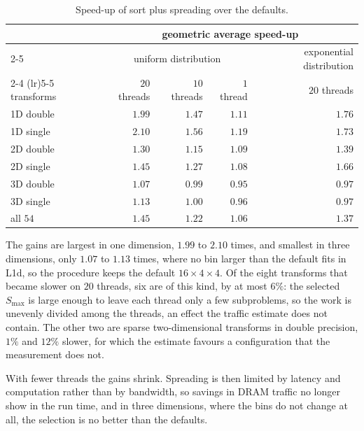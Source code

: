 \begin{table}[ht]
    \centering
    \small
    \begin{tabular}{lrrrr}
        \toprule
        & \multicolumn{4}{c}{geometric average speed-up} \\
        \cmidrule(lr){2-5}
        & \multicolumn{3}{c}{uniform distribution} & exponential distribution \\
        \cmidrule(lr){2-4} \cmidrule(lr){5-5}
        transforms & $20$ threads & $10$ threads & $1$ thread & $20$ threads \\
        \midrule
        1D double & $1.99$ & $1.47$ & $1.11$ & $1.76$ \\
        1D single & $2.10$ & $1.56$ & $1.19$ & $1.73$ \\
        2D double & $1.30$ & $1.15$ & $1.09$ & $1.39$ \\
        2D single & $1.45$ & $1.27$ & $1.08$ & $1.66$ \\
        3D double & $1.07$ & $0.99$ & $0.95$ & $0.97$ \\
        3D single & $1.13$ & $1.00$ & $0.96$ & $0.97$ \\
        \midrule
        all $54$ & $1.45$ & $1.22$ & $1.06$ & $1.37$ \\
        \bottomrule
    \end{tabular}
    \caption{Speed-up of sort plus spreading over the defaults.}
    \label{tab:selection_results}
\end{table}

The gains are largest in one dimension, $1.99$ to $2.10$ times, and smallest in three dimensions, only $1.07$ to $1.13$ times, where no bin larger than the default fits in L1d, so the procedure keeps the default $16 \times 4 \times 4$. Of the eight transforms that became slower on $20$ threads, six are of this kind, by at most $6\%$: the selected $S_{\max}$ is large enough to leave each thread only a few subproblems, so the work is unevenly divided among the threads, an effect the traffic estimate does not contain. The other two are sparse two-dimensional transforms in double precision, $1\%$ and $12\%$ slower, for which the estimate favours a configuration that the measurement does not.

With fewer threads the gains shrink. Spreading is then limited by latency and computation rather than by bandwidth, so savings in DRAM traffic no longer show in the run time, and in three dimensions, where the bins do not change at all, the selection is no better than the defaults.

